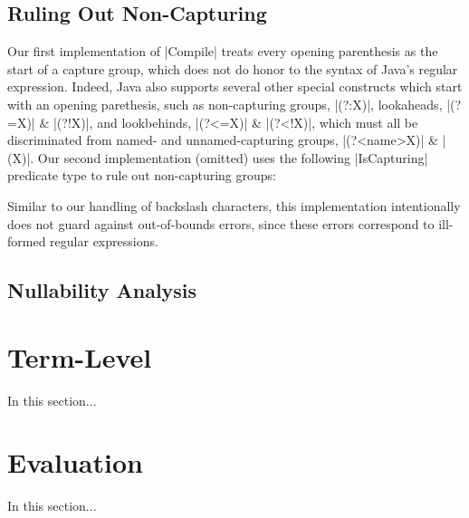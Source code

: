 \subsection{Ruling Out Non-Capturing}

Our first implementation of |Compile| treats every opening parenthesis as the start of a capture group, which does not do honor to the syntax of Java's regular expression.
Indeed, Java also supports several other special constructs which start with an opening parethesis, such as non-capturing groups, |(?:X)|, lookaheads, |(?=X)| \& |(?!X)|, and lookbehinds, |(?<=X)| \& |(?<!X)|, which must all be discriminated from named- and unnamed-capturing groups, |(?<name>X)| \& |(X)|.
Our second implementation (omitted) uses the following |IsCapturing| predicate type to rule out non-capturing groups:

\regexIsCapturing

\noindent
Similar to our handling of backslash characters, this implementation intentionally does not guard against out-of-bounds errors, since these errors correspond to ill-formed regular expressions.

\subsection{Nullability Analysis}


\regexIsNullable
%

\section{Term-Level}
\label{sec:term-level}

In this section...

\section{Evaluation}

In this section...
